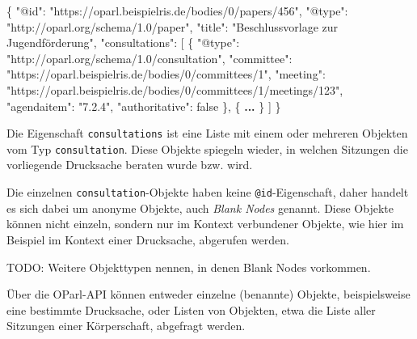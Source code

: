\documentclass[,a4paper]{article}
\newenvironment{Shaded}{}{}
\newcommand{\DataTypeTok}[1]{\textcolor[rgb]{0.56,0.13,0.00}{{#1}}}
\newcommand{\DecValTok}[1]{\textcolor[rgb]{0.25,0.63,0.44}{{#1}}}
\newcommand{\StringTok}[1]{\textcolor[rgb]{0.25,0.44,0.63}{{#1}}}
\newcommand{\ErrorTok}[1]{\textcolor[rgb]{1.00,0.00,0.00}{\textbf{{#1}}}}
\newcommand{\NormalTok}[1]{{#1}}
\begin{document}
\begin{Shaded}
\begin{Highlighting}[]
\NormalTok{\{}
    \DataTypeTok{"@id"}\NormalTok{: }\StringTok{"https://oparl.beispielris.de/bodies/0/papers/456"}\NormalTok{,}
    \DataTypeTok{"@type"}\NormalTok{: }\StringTok{"http://oparl.org/schema/1.0/paper"}\NormalTok{,}
    \DataTypeTok{"title"}\NormalTok{: }\StringTok{"Beschlussvorlage zur Jugendförderung"}\NormalTok{,}
    \DataTypeTok{"consultations"}\NormalTok{: [}
        \NormalTok{\{}
            \DataTypeTok{"@type"}\NormalTok{: }\StringTok{"http://oparl.org/schema/1.0/consultation"}\NormalTok{,}
            \DataTypeTok{"committee"}\NormalTok{: }\StringTok{"https://oparl.beispielris.de/bodies/0/committees/1"}\NormalTok{,}
            \DataTypeTok{"meeting"}\NormalTok{: }\StringTok{"https://oparl.beispielris.de/bodies/0/committees/1/meetings/123"}\NormalTok{,}
            \DataTypeTok{"agendaitem"}\NormalTok{: }\StringTok{"7.2.4"}\NormalTok{,}
            \DataTypeTok{"authoritative"}\NormalTok{: }\DecValTok{false}
        \NormalTok{\},}
        \NormalTok{\{}
            \ErrorTok{...}
        \NormalTok{\}}
    \NormalTok{]}
\NormalTok{\}}
\end{Highlighting}
\end{Shaded}

Die Eigenschaft \texttt{consultations} ist eine Liste mit einem oder
mehreren Objekten vom Typ \texttt{consultation}. Diese Objekte spiegeln
wieder, in welchen Sitzungen die vorliegende Drucksache beraten wurde
bzw. wird.

Die einzelnen \texttt{consultation}-Objekte haben keine
\texttt{@id}-Eigenschaft, daher handelt es sich dabei um anonyme
Objekte, auch \emph{Blank Nodes} genannt. Diese Objekte können nicht
einzeln, sondern nur im Kontext verbundener Objekte, wie hier im
Beispiel im Kontext einer Drucksache, abgerufen werden.

TODO: Weitere Objekttypen nennen, in denen Blank Nodes vorkommen.


Über die OParl-API können entweder einzelne (benannte) Objekte,
beispielsweise eine bestimmte Drucksache, oder Listen von Objekten, etwa
die Liste aller Sitzungen einer Körperschaft, abgefragt werden.
\end{document}
